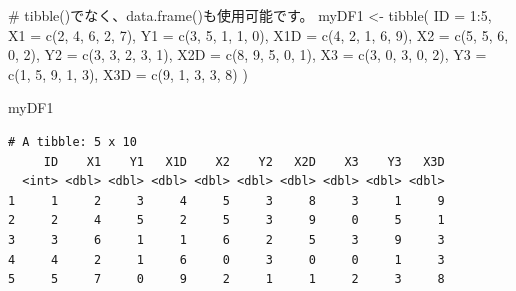 \documentclass[
  a4paper,
  pandoc,
  ja=standard,
  jafont=haranoaji]{bxjsbook}
\newenvironment{Shaded}{\begin{snugshade}}{\end{snugshade}}
\newcommand{\AttributeTok}[1]{\textcolor[rgb]{0.00,0.48,0.65}{#1}}
\newcommand{\CommentTok}[1]{\textcolor[rgb]{0.37,0.37,0.37}{#1}}
\newcommand{\DecValTok}[1]{\textcolor[rgb]{0.68,0.00,0.00}{#1}}
\newcommand{\FunctionTok}[1]{\textcolor[rgb]{0.28,0.35,0.67}{#1}}
\newcommand{\NormalTok}[1]{\textcolor[rgb]{0.00,0.48,0.65}{#1}}
\newcommand{\OtherTok}[1]{\textcolor[rgb]{0.00,0.48,0.65}{#1}}
\newcommand{\SpecialCharTok}[1]{\textcolor[rgb]{0.37,0.37,0.37}{#1}}
\begin{document}
\begin{Shaded}
\begin{Highlighting}[numbers=left,,]
\CommentTok{\# tibble()でなく、data.frame()も使用可能です。}
\NormalTok{myDF1 }\OtherTok{\textless{}{-}} \FunctionTok{tibble}\NormalTok{(}
  \AttributeTok{ID  =} \DecValTok{1}\SpecialCharTok{:}\DecValTok{5}\NormalTok{,}
  \AttributeTok{X1  =} \FunctionTok{c}\NormalTok{(}\DecValTok{2}\NormalTok{, }\DecValTok{4}\NormalTok{, }\DecValTok{6}\NormalTok{, }\DecValTok{2}\NormalTok{, }\DecValTok{7}\NormalTok{),}
  \AttributeTok{Y1  =} \FunctionTok{c}\NormalTok{(}\DecValTok{3}\NormalTok{, }\DecValTok{5}\NormalTok{, }\DecValTok{1}\NormalTok{, }\DecValTok{1}\NormalTok{, }\DecValTok{0}\NormalTok{),}
  \AttributeTok{X1D =} \FunctionTok{c}\NormalTok{(}\DecValTok{4}\NormalTok{, }\DecValTok{2}\NormalTok{, }\DecValTok{1}\NormalTok{, }\DecValTok{6}\NormalTok{, }\DecValTok{9}\NormalTok{),}
  \AttributeTok{X2  =} \FunctionTok{c}\NormalTok{(}\DecValTok{5}\NormalTok{, }\DecValTok{5}\NormalTok{, }\DecValTok{6}\NormalTok{, }\DecValTok{0}\NormalTok{, }\DecValTok{2}\NormalTok{),}
  \AttributeTok{Y2  =} \FunctionTok{c}\NormalTok{(}\DecValTok{3}\NormalTok{, }\DecValTok{3}\NormalTok{, }\DecValTok{2}\NormalTok{, }\DecValTok{3}\NormalTok{, }\DecValTok{1}\NormalTok{),}
  \AttributeTok{X2D =} \FunctionTok{c}\NormalTok{(}\DecValTok{8}\NormalTok{, }\DecValTok{9}\NormalTok{, }\DecValTok{5}\NormalTok{, }\DecValTok{0}\NormalTok{, }\DecValTok{1}\NormalTok{),}
  \AttributeTok{X3  =} \FunctionTok{c}\NormalTok{(}\DecValTok{3}\NormalTok{, }\DecValTok{0}\NormalTok{, }\DecValTok{3}\NormalTok{, }\DecValTok{0}\NormalTok{, }\DecValTok{2}\NormalTok{),}
  \AttributeTok{Y3  =} \FunctionTok{c}\NormalTok{(}\DecValTok{1}\NormalTok{, }\DecValTok{5}\NormalTok{, }\DecValTok{9}\NormalTok{, }\DecValTok{1}\NormalTok{, }\DecValTok{3}\NormalTok{),}
  \AttributeTok{X3D =} \FunctionTok{c}\NormalTok{(}\DecValTok{9}\NormalTok{, }\DecValTok{1}\NormalTok{, }\DecValTok{3}\NormalTok{, }\DecValTok{3}\NormalTok{, }\DecValTok{8}\NormalTok{)}
\NormalTok{)}

\NormalTok{myDF1}
\end{Highlighting}
\end{Shaded}

\begin{verbatim}
# A tibble: 5 x 10
     ID    X1    Y1   X1D    X2    Y2   X2D    X3    Y3   X3D
  <int> <dbl> <dbl> <dbl> <dbl> <dbl> <dbl> <dbl> <dbl> <dbl>
1     1     2     3     4     5     3     8     3     1     9
2     2     4     5     2     5     3     9     0     5     1
3     3     6     1     1     6     2     5     3     9     3
4     4     2     1     6     0     3     0     0     1     3
5     5     7     0     9     2     1     1     2     3     8
\end{verbatim}
\end{document}
